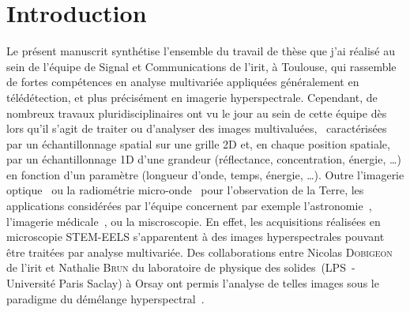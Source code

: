 
\chapter*{Introduction}
\label{ch:introduction}


 
Le présent manuscrit synthétise l'ensemble du travail de thèse que j'ai réalisé au sein de l'équipe de Signal et Communications de l'\gls{irit}, à Toulouse, qui rassemble de fortes compétences en analyse multivariée appliquées généralement en télédétection, et plus précisément en imagerie hyperspectrale. Cependant, de nombreux travaux pluridisciplinaires ont vu le jour au sein de cette équipe dès lors qu'il s'agit de traiter ou d'analyser des images multivaluées, \ie\ caractérisées par un échantillonnage spatial sur une grille 2D et, en chaque position spatiale, par un échantillonnage 1D d'une grandeur (réflectance, concentration, énergie, \dots) en fonction d'un paramètre (longueur d'onde, temps, énergie, \dots). Outre l'imagerie optique~\cite{lagrange2020neurocomputing, lagrange2020tgrs} ou la radiométrie micro-onde~\cite{wendt2016detection} pour l'observation de la Terre, les applications considérées par l'équipe concernent par exemple l'astronomie~\cite{guilloteau2020simulated, guilloteau2020fusion}, l'imagerie médicale~\cite{cavalcanti2018unmixing,cavalcanti2019factor}, ou la miscroscopie.
%
En effet, les acquisitions réalisées en microscopie STEM-EELS s'apparentent à des images hyperspectrales pouvant être traitées par analyse multivariée. Des collaborations entre Nicolas \textsc{Dobigeon} de l'\gls{irit} et Nathalie \textsc{Brun} du laboratoire de physique des solides~(LPS~- Université Paris Saclay) à Orsay ont permis l'analyse de telles images sous le paradigme du démélange hyperspectral~\cite{dobigeon2012spectral, dobigeon2016linear}.

